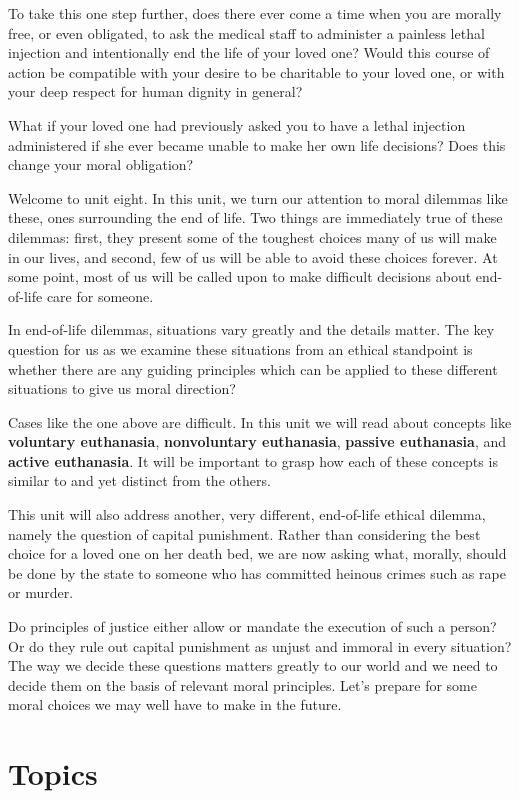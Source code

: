 \documentclass[
]{book}
\begin{document}
To take this one step further, does there ever come a time when you are morally free, or even obligated, to ask the medical staff to administer a painless lethal injection and intentionally end the life of your loved one? Would this course of action be compatible with your desire to be charitable to your loved one, or with your deep respect for human dignity in general?

What if your loved one had previously asked you to have a lethal injection administered if she ever became unable to make her own life decisions? Does this change your moral obligation?

Welcome to unit eight. In this unit, we turn our attention to moral dilemmas like these, ones surrounding the end of life. Two things are immediately true of these dilemmas: first, they present some of the toughest choices many of us will make in our lives, and second, few of us will be able to avoid these choices forever. At some point, most of us will be called upon to make difficult decisions about end-of-life care for someone.

In end-of-life dilemmas, situations vary greatly and the details matter. The key question for us as we examine these situations from an ethical standpoint is whether there are any guiding principles which can be applied to these different situations to give us moral direction?

Cases like the one above are difficult. In this unit we will read about concepts like \textbf{voluntary euthanasia}, \textbf{nonvoluntary euthanasia}, \textbf{passive euthanasia}, and \textbf{active euthanasia}. It will be important to grasp how each of these concepts is similar to and yet distinct from the others.

This unit will also address another, very different, end-of-life ethical dilemma, namely the question of capital punishment. Rather than considering the best choice for a loved one on her death bed, we are now asking what, morally, should be done by the state to someone who has committed heinous crimes such as rape or murder.

Do principles of justice either allow or mandate the execution of such a person? Or do they rule out capital punishment as unjust and immoral in every situation? The way we decide these questions matters greatly to our world and we need to decide them on the basis of relevant moral principles.
Let's prepare for some moral choices we may well have to make in the future.

\hypertarget{topics-7}{%
\section{Topics}\label{topics-7}}
\end{document}

